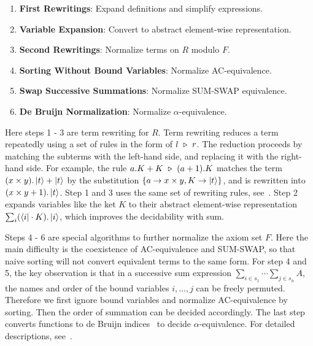 \begin{enumerate}
    \item \textbf{First Rewritings}: Expand definitions and simplify expressions.
    \item \textbf{Variable Expansion}: Convert to abstract element-wise representation.
    \item \textbf{Second Rewritings}: Normalize terms on \( R \) modulo \( F \).
    \item \textbf{Sorting Without Bound Variables}: Normalize AC-equivalence.
    \item \textbf{Swap Successive Summations}: Normalize SUM-SWAP equivalence.
    \item \textbf{De Bruijn Normalization}: Normalize \( \alpha \)-equivalence.
\end{enumerate}

Here steps 1 - 3 are term rewriting for $R$. 
Term rewriting reduces a term repeatedly using a set of rules in the form of $l\ \triangleright\ r$. The reduction proceeds by matching the subterms with the left-hand side, and replacing it with the right-hand side. 
For example, the rule $a.K + K\ \triangleright\ (a + 1).K$ matches the term $(x\times y) . \ket{t} + \ket{t}$ by the substitution $\{a \to  x\times y, K \to \ket{t}\}$, and is rewritten into $(x\times y + 1) . \ket{t}$.
Step 1 and 3 uses the same set of rewriting rules, see~.
Step 2 expands variables like the ket $K$ to their abstract element-wise representation $\sum_{i} (\bra{i} \cdot K). \ket{i}$, which improves the decidability with sum. 


Steps 4 - 6 are special algorithms to further normalize the axiom set $F$.
Here the main difficulty is the coexistence of AC-equivalence and SUM-SWAP, so that naive sorting will not convert equivalent terms to the same form.
For step 4 and 5, the key observation is that in a successive sum expression \( \sum_{i \in s_1} \cdots \sum_{j \in s_n} A \), the names and order of the bound variables \( i, \dots, j \) can be freely permuted. Therefore we first ignore bound variables and normalize AC-equivalence by sorting. Then the order of summation can be decided accordingly. The last step converts functions to de Bruijn indices~\cite{deBruijn1972lambda} to decide $\alpha$-equivalence. For detailed descriptions, see~.


